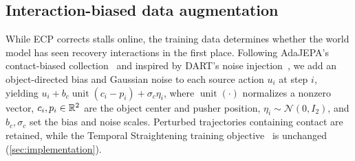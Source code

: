 \subsection{Interaction-biased data augmentation}
\label{sec:data}
While ECP corrects stalls online, the training data determines whether the world model has seen recovery interactions in the first place. Following AdaJEPA's contact-biased collection~\cite{wang2026adajepa} and inspired by DART's noise injection~\cite{laskey2017dart}, we add an object-directed bias and Gaussian noise to each source action $u_i$ at step $i$, yielding $u_i+b_c\operatorname{unit}(c_i-p_i)+\sigma_c\eta_i$, where $\operatorname{unit}(\cdot)$ normalizes a nonzero vector, $c_i,p_i\in\mathbb{R}^2$ are the object center and pusher position, $\eta_i\sim\mathcal N(0,I_2)$, and $b_c,\sigma_c$ set the bias and noise scales. Perturbed trajectories containing contact are retained, while the Temporal Straightening training objective~\cite{wang2026straightening} is unchanged (\cref{sec:implementation}).

